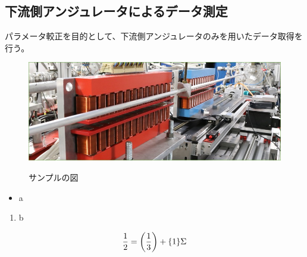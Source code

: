 \documentclass[a4paper,11pt,uplatex]{jsbook}
\begin{document}
\subsection{下流側アンジュレータによるデータ測定}
パラメータ較正を目的として、下流側アンジュレータのみを用いたデータ取得を行う。

\clearpage

\begin{figure}[tb]
  \centering
  \includegraphics[width=0.8\linewidth]{image/1-1.jpg}\\
  \caption{サンプルの図}
  \label{sample_image}
\end{figure}

\begin{itemize}
  \item a
\end{itemize}
\begin{enumerate}
  \item b
\end{enumerate}

\begin{align}
\frac{1}{2} = \qty(\frac{1}{3}) + \qty{1}\Sigma
\end{align}
\end{document}
